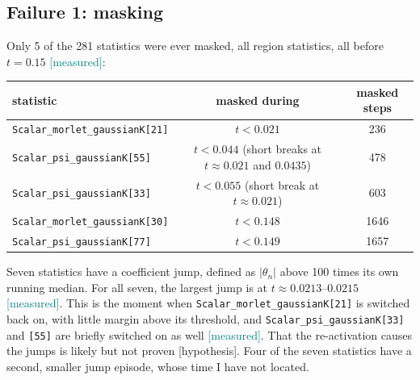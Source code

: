 \documentclass[11pt,a4paper]{article}
\newcommand{\code}[1]{\texttt{#1}}
\newcommand{\meas}{\textcolor{teal}{\textsf{[measured]}}}
\newcommand{\hyp}{\textcolor{orange!80!black}{\textsf{[hypothesis]}}}
\begin{document}
\subsection{Failure 1: masking}
Only 5 of the 281 statistics were ever masked, all region statistics, all before $t=0.15$ \meas:
\begin{center}\small
\begin{tabular}{lcc}
\toprule
statistic & masked during & masked steps\\
\midrule
\code{Scalar\_morlet\_gaussianK[21]} & $t<0.021$ & 236\\
\code{Scalar\_psi\_gaussianK[55]} & $t<0.044$ (short breaks at $t\approx0.021$ and $0.0435$) & 478\\
\code{Scalar\_psi\_gaussianK[33]} & $t<0.055$ (short break at $t\approx0.021$) & 603\\
\code{Scalar\_morlet\_gaussianK[30]} & $t<0.148$ & 1646\\
\code{Scalar\_psi\_gaussianK[77]} & $t<0.149$ & 1657\\
\bottomrule
\end{tabular}
\end{center}
Seven statistics have a coefficient jump, defined as $|\theta_n|$ above 100 times its own running
median. For all seven, the largest jump is at $t\approx0.0213$--$0.0215$ \meas. This is the moment
when \code{Scalar\_morlet\_gaussianK[21]} is switched back on, with little margin above its threshold,
and \code{Scalar\_psi\_gaussianK[33]} and \code{[55]} are briefly switched on as well \meas. That the
re-activation causes the jumps is likely but not proven \hyp. Four of the seven statistics have a
second, smaller jump episode, whose time I have not located.
\end{document}
